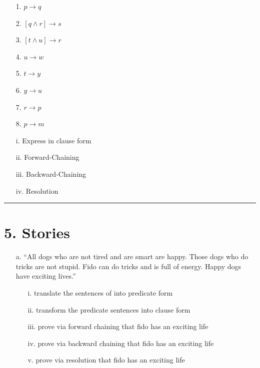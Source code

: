 \documentclass[11pt]{article}
\begin{document}
\begin{flushleft}
\begin{enumerate}
        \begin{enumerate}[leftmargin=8em]
            \item[1.] $p \rightarrow q$
            \item[2.] $[q \land r] \rightarrow s$
            \item[3.] $[t \land u] \rightarrow r$
            \item[4.] $u \rightarrow w$
            \item[5.] $t \rightarrow y$
            \item[6.] $y \rightarrow u$
            \item[7.] $r \rightarrow p$
            \item[8.] $p \rightarrow m$
        \end{enumerate}

        \begin{enumerate}
            \item[i.] Express in clause form
            \item[ii.] Forward-Chaining
            \item[iii.] Backward-Chaining
            \item[iv.] Resolution
        \end{enumerate}

\end{enumerate}

\rule[0.1pt]{40em}{1.0pt}

\section*{5. Stories}
\begin{enumerate}

    \item[a.] “All dogs who are not tired and are smart are happy.  Those dogs
        who do tricks are not stupid.  Fido can do tricks and is full of
        energy.  Happy dogs have exciting lives.”

        \begin{enumerate}
            \item[i.] translate the sentences of into predicate form
            \item[ii.] transform the predicate sentences into clause form
            \item[iii.] prove via forward chaining that fido has an exciting life
            \item[iv.] prove via backward chaining that fido has an exciting life
            \item[v.] prove via resolution that fido has an exciting life
        \end{enumerate}


\end{enumerate}
\end{flushleft}
\end{document}
